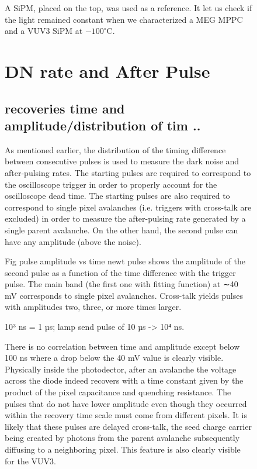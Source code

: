 \documentclass[a4paper, 11pt]{report}%
\begin{document}
\begin{figure}[!hbtp]
  
  
  A SiPM, placed on the top, was used as a reference. It let us check if the light remained constant when we characterized a MEG MPPC and a VUV3 SiPM at 
  $-100^\circ$C.
  
  
  \section{DN rate and After Pulse}
  
  \subsection{recoveries time and amplitude/distribution of tim ..}
  
  As mentioned earlier, the distribution of the timing difference between consecutive pulses is used to measure the dark noise and 
  after-pulsing rates. The starting pulses are required to correspond to the oscilloscope trigger in order to properly
  account for the oscilloscope dead time. The starting pulses are also required to correspond to single pixel avalanches
  (i.e. triggers with cross-talk are excluded) in order to measure the after-pulsing rate generated by a single parent avalanche.
  On the other hand, the second pulse can have any amplitude (above the noise). 
  
  Fig pulse amplitude vs time newt pulse shows the amplitude of the second pulse as a function of the time difference with the trigger
  pulse. 
  The main band (the first one with fitting function) at ∼40 mV corresponds to single pixel avalanches. 
  Cross-talk yields pulses with amplitudes two, three, or more times larger. 
  
  10³ ns = 1 µs; lamp send pulse of 10 µs -> 10⁴ ns.
  
  There is no correlation between time and amplitude except below 100 ns where a drop below the 40 mV value is clearly visible. 
  Physically inside the  photodector, after an avalanche the voltage across the diode indeed recovers with a time constant 
  given by the product of the pixel capacitance and quenching resistance. The pulses that do not have lower amplitude even
  though they occurred within the recovery time scale must
  come from different pixels. It is likely that these pulses are
  delayed cross-talk, the seed charge carrier being created by
  photons from the parent avalanche subsequently diffusing to
  a neighboring pixel. This feature is also clearly visible for the VUV3. 
  

\end{figure}
\end{document}

